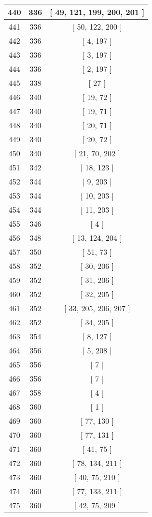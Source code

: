 \begin{center}
\begin{longtable}[H]{|| c c c ||}
440 & 336 & [ 49, 121, 199, 200, 201 ]
\\\hline
441 & 336 & [ 50, 122, 200 ]
\\\hline
442 & 336 & [ 4, 197 ]
\\\hline
443 & 336 & [ 3, 197 ]
\\\hline
444 & 336 & [ 2, 197 ]
\\\hline
445 & 338 & [ 27 ]
\\\hline
446 & 340 & [ 19, 72 ]
\\\hline
447 & 340 & [ 19, 71 ]
\\\hline
448 & 340 & [ 20, 71 ]
\\\hline
449 & 340 & [ 20, 72 ]
\\\hline
450 & 340 & [ 21, 70, 202 ]
\\\hline
451 & 342 & [ 18, 123 ]
\\\hline
452 & 344 & [ 9, 203 ]
\\\hline
453 & 344 & [ 10, 203 ]
\\\hline
454 & 344 & [ 11, 203 ]
\\\hline
455 & 346 & [ 4 ]
\\\hline
456 & 348 & [ 13, 124, 204 ]
\\\hline
457 & 350 & [ 51, 73 ]
\\\hline
458 & 352 & [ 30, 206 ]
\\\hline
459 & 352 & [ 31, 206 ]
\\\hline
460 & 352 & [ 32, 205 ]
\\\hline
461 & 352 & [ 33, 205, 206, 207 ]
\\\hline
462 & 352 & [ 34, 205 ]
\\\hline
463 & 354 & [ 8, 127 ]
\\\hline
464 & 356 & [ 5, 208 ]
\\\hline
465 & 356 & [ 7 ]
\\\hline
466 & 356 & [ 7 ]
\\\hline
467 & 358 & [ 4 ]
\\\hline
468 & 360 & [ 1 ]
\\\hline
469 & 360 & [ 77, 130 ]
\\\hline
470 & 360 & [ 77, 131 ]
\\\hline
471 & 360 & [ 41, 75 ]
\\\hline
472 & 360 & [ 78, 134, 211 ]
\\\hline
473 & 360 & [ 40, 75, 210 ]
\\\hline
474 & 360 & [ 77, 133, 211 ]
\\\hline
475 & 360 & [ 42, 75, 209 ]
\\\hline

\end{longtable}
\end{center}
